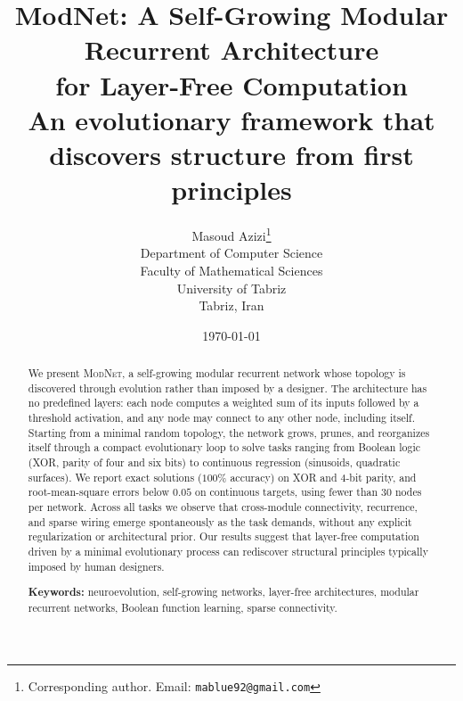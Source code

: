 \documentclass[11pt,a4paper]{report}
\theoremstyle{definition}
\theoremstyle{remark}
\newcommand{\modnet}{\textsc{ModNet}}
\begin{document}
\title{%
  \textbf{ModNet: A Self-Growing Modular Recurrent Architecture\\[0.3em]
  for Layer-Free Computation}\\[1em]
  \large An evolutionary framework that discovers structure
  from first principles
}

\author{%
  Masoud Azizi\thanks{Corresponding author. Email: \texttt{mablue92@gmail.com}} \\[0.5em]
  \small Department of Computer Science \\
  \small Faculty of Mathematical Sciences \\
  \small University of Tabriz \\
  \small Tabriz, Iran
}

\date{\today}

\maketitle

\begin{abstract}
\noindent
We present \modnet{}, a self-growing modular recurrent network whose
topology is discovered through evolution rather than imposed by a
designer. The architecture has no predefined layers: each node
computes a weighted sum of its inputs followed by a threshold
activation, and any node may connect to any other node, including
itself. Starting from a minimal random topology, the network grows,
prunes, and reorganizes itself through a compact evolutionary loop to
solve tasks ranging from Boolean logic (XOR, parity of four and six
bits) to continuous regression (sinusoids, quadratic surfaces). We
report exact solutions ($100\%$ accuracy) on XOR and 4-bit parity, and
root-mean-square errors below $0.05$ on continuous targets, using
fewer than $30$ nodes per network. Across all tasks we observe that
cross-module connectivity, recurrence, and sparse wiring emerge
spontaneously as the task demands, without any explicit regularization
or architectural prior. Our results suggest that layer-free
computation driven by a minimal evolutionary process can rediscover
structural principles typically imposed by human designers.

\vspace{1em}
\noindent
\textbf{Keywords:} neuroevolution, self-growing networks, layer-free
architectures, modular recurrent networks, Boolean function learning,
sparse connectivity.
\end{abstract}
\end{document}
